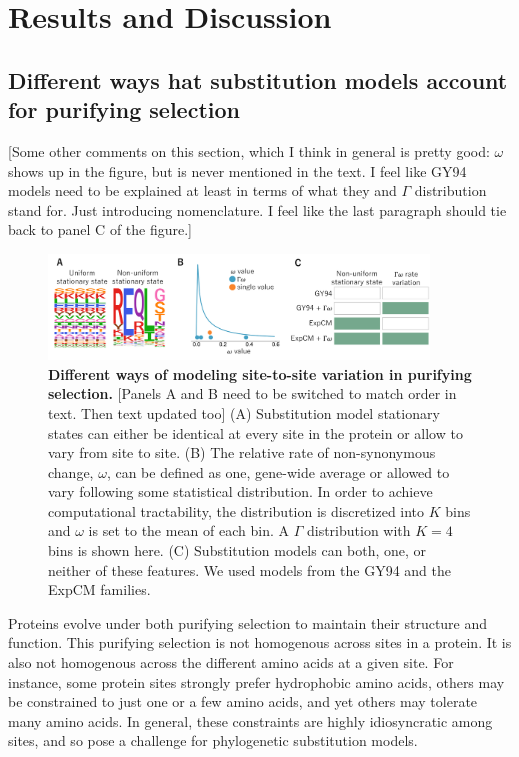 \documentclass[11pt]{article}
\newcommand\jdbcomment[1]{{\color{red}[#1]}}
\begin{document}
\section*{Results and Discussion}

\subsection*{Different ways hat substitution models account for purifying selection}

\jdbcomment{Some other comments on this section, which I think in general is pretty good: $\omega$ shows up in the figure, but is never mentioned in the text. I feel like GY94 models need to be explained at least in terms of what they and $\Gamma$ distribution stand for. Just introducing nomenclature. I feel like the last paragraph should tie back to panel C of the figure.}

\begin{figure}[H]
\centerline{\includegraphics[width=0.90\textwidth]{figures/model_feature.pdf}}
\caption{\label{fig:model_feature}
\textbf{Different ways of modeling site-to-site variation in purifying selection.}
\jdbcomment{Panels A and B need to be switched to match order in text. Then text updated too}
(A) Substitution model stationary states can either be identical at every site in the protein or allow to vary from site to site. 
(B) The relative rate of non-synonymous change, $\omega$, can be defined as one, gene-wide average or allowed to vary following some statistical distribution.
In order to achieve computational tractability, the distribution is discretized into $K$ bins and $\omega$ is set to the mean of each bin. 
A $\Gamma$ distribution with $K=4$ bins is shown here. 
(C) Substitution models can both, one, or neither of these features. 
We used models from the GY94 and the ExpCM families. 
}
\end{figure}

Proteins evolve under both purifying selection to maintain their structure and function. 
This purifying selection is not homogenous across sites in a protein.
It is also not homogenous across the different amino acids at a given site.
For instance, some protein sites strongly prefer hydrophobic amino acids, others may be constrained to just one or a few amino acids, and yet others may tolerate many amino acids.
In general, these constraints are highly idiosyncratic among sites, and so pose a challenge for phylogenetic substitution models.
\end{document}
